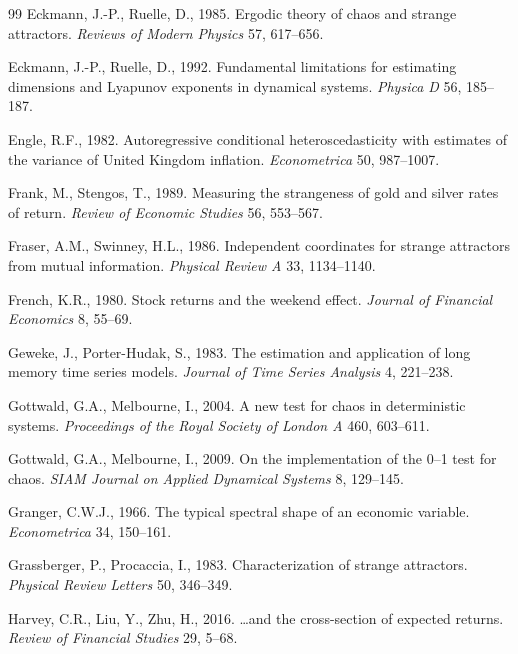 \documentclass[11pt,a4paper]{article}
\begin{document}
\begin{thebibliography}{99}
Eckmann, J.-P., Ruelle, D., 1985. Ergodic theory of chaos and strange attractors. \emph{Reviews of Modern Physics}
57, 617--656.

Eckmann, J.-P., Ruelle, D., 1992. Fundamental limitations for estimating dimensions and Lyapunov exponents in dynamical
systems. \emph{Physica D} 56, 185--187.

Engle, R.F., 1982. Autoregressive conditional heteroscedasticity with estimates of the variance of United Kingdom
inflation. \emph{Econometrica} 50, 987--1007.

Frank, M., Stengos, T., 1989. Measuring the strangeness of gold and silver rates of return. \emph{Review of Economic
Studies} 56, 553--567.

Fraser, A.M., Swinney, H.L., 1986. Independent coordinates for strange attractors from mutual information.
\emph{Physical Review A} 33, 1134--1140.

French, K.R., 1980. Stock returns and the weekend effect. \emph{Journal of Financial Economics} 8, 55--69.

Geweke, J., Porter-Hudak, S., 1983. The estimation and application of long memory time series models. \emph{Journal
of Time Series Analysis} 4, 221--238.

Gottwald, G.A., Melbourne, I., 2004. A new test for chaos in deterministic systems. \emph{Proceedings of the Royal
Society of London A} 460, 603--611.

Gottwald, G.A., Melbourne, I., 2009. On the implementation of the 0--1 test for chaos. \emph{SIAM Journal on Applied
Dynamical Systems} 8, 129--145.

Granger, C.W.J., 1966. The typical spectral shape of an economic variable. \emph{Econometrica} 34, 150--161.

Grassberger, P., Procaccia, I., 1983. Characterization of strange attractors. \emph{Physical Review Letters} 50,
346--349.

Harvey, C.R., Liu, Y., Zhu, H., 2016. \ldots and the cross-section of expected returns. \emph{Review of Financial
Studies} 29, 5--68.


\end{thebibliography}
\end{document}
